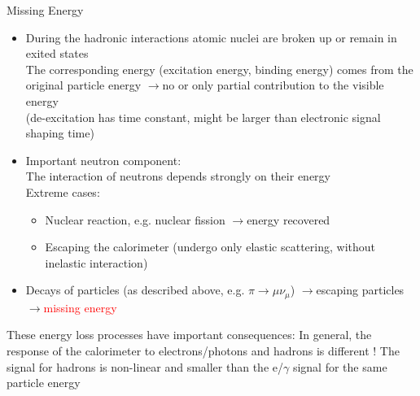 \documentclass[style=husky,clock,size=9pt,dvipsnames]{powerdot}
\newcommand\ra{$\rightarrow$} %
\newcommand\myred{\textcolor{Red}} %
\begin{document}
\begin{slide}[trans=Fly,toc=]{Missing Energy}
\begin{itemize}
	\item During the hadronic interactions atomic nuclei are broken up or remain in exited states\\
	The corresponding energy (excitation energy, binding energy) comes from the original particle energy
	\ra no or only partial contribution to the visible energy\\	
	{\small(de-excitation has time constant, might be larger than electronic signal shaping time)}
	\item Important neutron component:\\
	The interaction of neutrons depends strongly on their energy\\
	Extreme cases:
	\begin{itemize}
		\item Nuclear reaction, e.g. nuclear fission \ra energy recovered
		\item Escaping the calorimeter (undergo only elastic scattering, without inelastic interaction)
	\end{itemize}
	\item Decays of particles (as described above, e.g. $\pi\rightarrow\mu\nu_\mu$) \ra escaping particles \ra \myred{missing energy}
\end{itemize}
\begin{tcolorbox}
	{\small These energy loss processes have important consequences:
	In general, the response of the calorimeter to electrons/photons and hadrons
	is different ! The signal for hadrons is non-linear and smaller than the e/$\gamma$ signal for the same particle energy}
\end{tcolorbox}
\end{slide}
\end{document}
